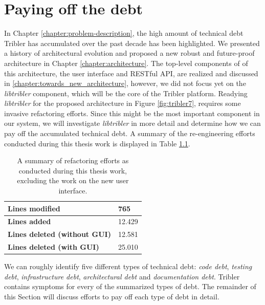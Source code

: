\chapter{Paying off the debt}
\label{chapter:refactoring}
In Chapter \ref{chapter:problem-description}, the high amount of technical debt Tribler has accumulated over the past decade has been highlighted. We presented a history of architectural evolution and proposed a new robust and future-proof architecture in Chapter \ref{chapter:architecture}. The top-level components of of this architecture, the user interface and RESTful API, are realized and discussed in \ref{chapter:towards_new_architecture}, however, we did not focus yet on the \emph{libtribler} component, which will be the core of the Tribler platform. Readying \emph{libtribler} for the proposed architecture in Figure \ref{fig:tribler7}, requires some invasive refactoring efforts. Since this might be the most important component in our system, we will investigate \emph{libtribler} in more detail and determine how we can pay off the accumulated technical debt. A summary of the re-engineering efforts conducted during this thesis work is displayed in Table \ref{table:refactoring-summary}.\\

\begin{table}[h!]
	\centering
	\begin{tabular}{|l|l|}
		\hline
		\textbf{Lines modified} & 765 \\ \hline
		\textbf{Lines added} & 12.429 \\ \hline
		\textbf{Lines deleted (without GUI)} & 12.581 \\ \hline
		\textbf{Lines deleted (with GUI)} & 25.010 \\ \hline
	\end{tabular}
	\caption{A summary of refactoring efforts as conducted during this thesis work, excluding the work on the new user interface.}
	\label{table:refactoring-summary}
\end{table}

We can roughly identify five different types of technical debt\cite{seaman2011measuring}: \emph{code debt}, \emph{testing debt}, \emph{infrastructure debt}, \emph{architectural debt} and \emph{documentation debt}. Tribler contains symptoms for every of the summarized types of debt. The remainder of this Section will discuss efforts to pay off each type of debt in detail.

